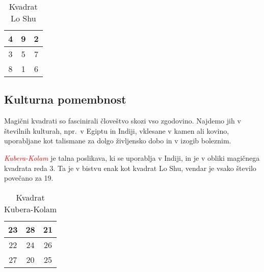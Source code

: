 \documentclass[a4paper,12pt]{article}
\newcommand{\pojem}[1]{\emph{#1}}
\begin{document}
\begin{table}[h]
   \centering
   \caption{Kvadrat Lo Shu}
   \label{table:loshu}
   \begin{tabular}{|*{3}{c|}}
      \hline
      4 & 9 & 2 \\
      \hline
      3 & 5 & 7 \\
      \hline
      8 & 1 & 6 \\
      \hline
   \end{tabular}
   
\end{table}


\subsection{Kulturna pomembnost}

Magični kvadrati so fascinirali človeštvo skozi vso zgodovino. Najdemo jih
v številnih kulturah, npr.\ v Egiptu in Indiji, vklesane v kamen ali
kovino, uporabljane kot talismane za dolgo življensko dobo in v
izogib boleznim.

\textcolor{red}{\pojem{Kubera-Kolam}} je talna poslikava, ki se uporablja v Indiji, in je v
obliki magičnega kvadrata reda 3. Ta je v bistvu enak kot kvadrat
Lo Shu, vendar je vsako število povečano za 19.
\begin{table}[h]
   \centering
   \caption{Kvadrat Kubera-Kolam}
   \label{table:kubera}
   \begin{tabular}{|*{3}{c|}}
      \hline
      23 & 28 & 21 \\
      \hline
      22 & 24 & 26 \\
      \hline
      27 & 20 & 25 \\
      \hline
      
   \end{tabular}

\end{table}
\end{document}
